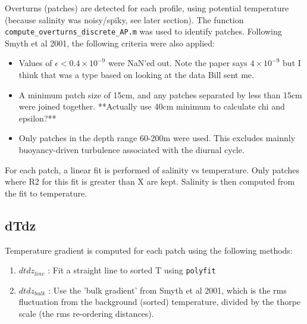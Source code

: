 \documentclass[11pt]{article}
\begin{document}
Overturns (patches) are detected for each profile, using potential temperature (because salinity was noisy/spiky, see later section). The function \verb+compute_overturns_discrete_AP.m+ was used to identify patches. \newline
Following Smyth et al 2001, the following criteria were also applied:
\begin{itemize}
\item Values of $\epsilon <0.4\times 10^{-9}$ were NaN'ed out. Note the paper says $4\times 10^{-9}$ but I think that was a type based on looking at the data Bill sent me.
\item A minimum patch size of 15cm, and any patches separated by less than 15cm were joined together. **Actually use 40cm minimum to calculate chi and epsilon?**
\item Only patches in the depth range 60-200m were used. This excludes mainnly buoyancy-driven turbulence associated with the diurnal cycle.
\end{itemize}


For each patch, a linear fit is performed of salinity vs temperature. Only patches where R2 for this fit is greater than X are kept. Salinity is then computed from the fit to temperature.


\subsection{dTdz}

Temperature gradient is computed for each patch using the following methods:
\begin{enumerate}
\item $dtdz_{line}$ : Fit a straight line to sorted T using \verb+polyfit+
\item $dtdz_{bulk}$ : Use the 'bulk gradient' from Smyth et al 2001, which is the rms fluctuation from the background (sorted) temperature, divided by the thorpe scale (the rms re-ordering distances).
\end{enumerate}
\end{document}
